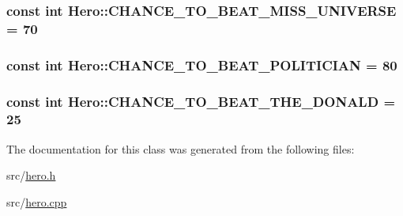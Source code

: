 \subsubsection[{\texorpdfstring{C\+H\+A\+N\+C\+E\+\_\+\+T\+O\+\_\+\+B\+E\+A\+T\+\_\+\+M\+I\+S\+S\+\_\+\+U\+N\+I\+V\+E\+R\+SE}{CHANCE_TO_BEAT_MISS_UNIVERSE}}]{\setlength{\rightskip}{0pt plus 5cm}const int Hero\+::\+C\+H\+A\+N\+C\+E\+\_\+\+T\+O\+\_\+\+B\+E\+A\+T\+\_\+\+M\+I\+S\+S\+\_\+\+U\+N\+I\+V\+E\+R\+SE = 70\hspace{0.3cm}{\ttfamily [static]}}\hypertarget{classHero_a13075687fe82d8eee2bd7ef77222ca4f}{}\label{classHero_a13075687fe82d8eee2bd7ef77222ca4f}
\subsubsection[{\texorpdfstring{C\+H\+A\+N\+C\+E\+\_\+\+T\+O\+\_\+\+B\+E\+A\+T\+\_\+\+P\+O\+L\+I\+T\+I\+C\+I\+AN}{CHANCE_TO_BEAT_POLITICIAN}}]{\setlength{\rightskip}{0pt plus 5cm}const int Hero\+::\+C\+H\+A\+N\+C\+E\+\_\+\+T\+O\+\_\+\+B\+E\+A\+T\+\_\+\+P\+O\+L\+I\+T\+I\+C\+I\+AN = 80\hspace{0.3cm}{\ttfamily [static]}}\hypertarget{classHero_a8fe3d6c05946b15de5b08e912fe226fc}{}\label{classHero_a8fe3d6c05946b15de5b08e912fe226fc}
\subsubsection[{\texorpdfstring{C\+H\+A\+N\+C\+E\+\_\+\+T\+O\+\_\+\+B\+E\+A\+T\+\_\+\+T\+H\+E\+\_\+\+D\+O\+N\+A\+LD}{CHANCE_TO_BEAT_THE_DONALD}}]{\setlength{\rightskip}{0pt plus 5cm}const int Hero\+::\+C\+H\+A\+N\+C\+E\+\_\+\+T\+O\+\_\+\+B\+E\+A\+T\+\_\+\+T\+H\+E\+\_\+\+D\+O\+N\+A\+LD = 25\hspace{0.3cm}{\ttfamily [static]}}\hypertarget{classHero_a470885608dec7243532ca656b52feead}{}\label{classHero_a470885608dec7243532ca656b52feead}


The documentation for this class was generated from the following files\+:\begin{DoxyCompactItemize}
\item 
src/\hyperlink{hero_8h}{hero.\+h}\item 
src/\hyperlink{hero_8cpp}{hero.\+cpp}\end{DoxyCompactItemize}
